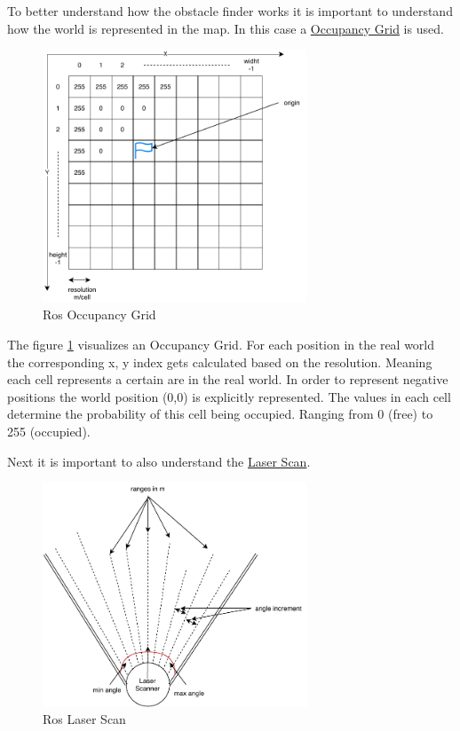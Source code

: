 \documentclass[main.tex]{subfiles}
\begin{document}
		To better understand how the obstacle finder works it is important to understand how the world is represented in the map. In this case a \href{http://docs.ros.org/kinetic/api/nav_msgs/html/msg/OccupancyGrid.html}{Occupancy Grid} is used.
		
		\begin{figure}[H]
			\centering
			\includegraphics[width=0.7\textwidth]{pictures/obstacle_finder/Gridmap.pdf}
			\caption{Ros Occupancy Grid}
			\label{img_occ_grid}
		\end{figure}
		
		The figure \ref{img_occ_grid} visualizes an Occupancy Grid. For each position in the real world the corresponding x, y index gets calculated based on the resolution. Meaning each cell represents a certain are in the real world. In order to represent negative positions the world position (0,0) is explicitly represented. The values in each cell determine the probability of this cell being occupied. Ranging from 0 (free) to 255 (occupied).
		
		Next it is important to also understand the \href{http://docs.ros.org/melodic/api/sensor_msgs/html/msg/LaserScan.html}{Laser Scan}. 
		\begin{figure}[H]
			\centering
			\includegraphics[width=0.7\textwidth]{pictures/obstacle_finder/laserSnan.pdf}
			\caption{Ros Laser Scan}
			\label{img_laser_scan}
		\end{figure}
		 
\end{document}
